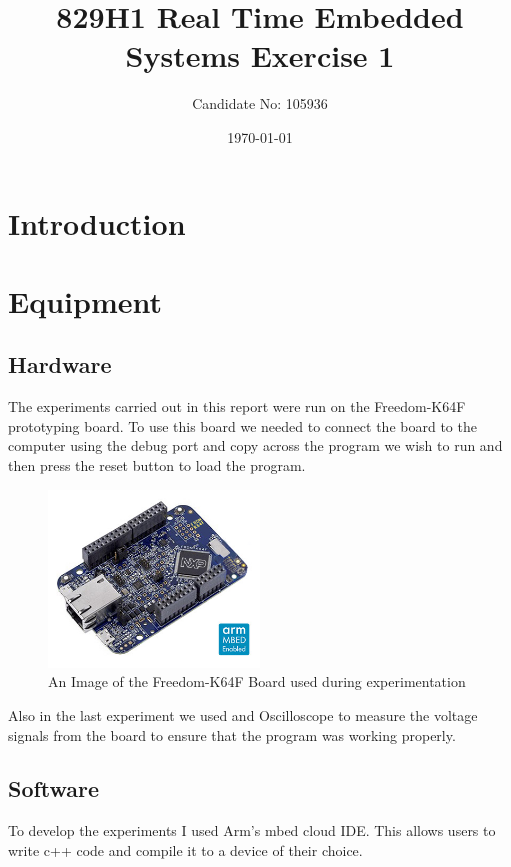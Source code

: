 \documentclass[a4paper,12pt]{scrartcl}
\title{829H1 Real Time Embedded Systems Exercise 1}
\author{Candidate No: 105936}
\date{\today}
\begin{document}
	
	\begin{titlepage}
		\maketitle
	\end{titlepage}
	
	\tableofcontents
	\newpage
	
	\section{Introduction}
	{
		
	}

	\section{Equipment}
	{
		\subsection{Hardware}{
			The experiments carried out in this report were run on the Freedom-K64F prototyping board\cite{nxpproducts2014}. To use this board we needed to connect the board to the computer using the debug port and copy across the program we wish to run and then press the reset button to load the program.
			\begin{figure}[h]
				\centering
				\includegraphics[width=0.5\textwidth]{FRDM-K64F-ANGLE}
				\caption{An Image of the Freedom-K64F Board used during experimentation\cite{nxpproducts2014}}
				\label{img:FRDM-K64F}
			\end{figure}
			Also in the last experiment we used and Oscilloscope to measure the voltage signals from the board to ensure that the program was working properly.
		}
		\subsection{Software}
		{
			To develop the experiments I used Arm's mbed cloud IDE. This allows users to write c++ code and compile it to a device of their choice. 
		}
	}
	
\end{document}
